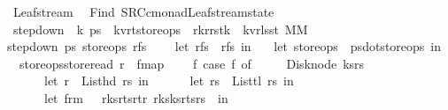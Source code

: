 %
\begin{isabellebody}%
%
%
\isadelimtheory
%
\endisadelimtheory
%
\isatagtheory
{}\isamarkupfalse%
\ Leaf{\isacharunderscore}stream\ \isanewline
{}\ Find\ {\isachardoublequoteopen}{\isachardollar}SRC{\isacharslash}c{\isacharunderscore}monad{\isacharslash}Leaf{\isacharunderscore}stream{\isacharunderscore}state{\isachardoublequoteclose}\isanewline
{}%
\endisatagtheory
{\isafoldtheory}%
%
\isadelimtheory
\isanewline
%
\endisadelimtheory
\isanewline
\isanewline
{}\isamarkupfalse%
\ step{\isacharunderscore}down\ {\isacharcolon}{\isacharcolon}\ {\isachardoublequoteopen}{\isacharprime}k\ ps{}\ {\isasymRightarrow}\ {\isacharparenleft}{\isacharprime}k{\isacharcomma}{\isacharprime}v{\isacharcomma}{\isacharprime}r{\isacharcomma}{\isacharprime}t{\isacharparenright}store{\isacharunderscore}ops\ {\isasymRightarrow}\ {\isacharprime}r{\isacharasterisk}{\isacharparenleft}{\isacharprime}k{\isacharcomma}{\isacharprime}r{\isacharparenright}rstk\ {\isasymRightarrow}\ {\isacharparenleft}{\isacharparenleft}{\isacharprime}k{\isacharcomma}{\isacharprime}v{\isacharcomma}{\isacharprime}r{\isacharparenright}lss{\isacharcomma}{\isacharprime}t{\isacharparenright}\ MM{\isachardoublequoteclose}\ \isanewline
{\isachardoublequoteopen}step{\isacharunderscore}down\ ps{}\ store{\isacharunderscore}ops\ rfs\ {\isacharequal}\ {\isacharparenleft}\isanewline
\ \ let\ {\isacharparenleft}r{\isacharcomma}fs{\isacharparenright}\ {\isacharequal}\ rfs\ in\isanewline
\ \ {\isacharparenleft}{\isacharasterisk}\ let\ store{\isacharunderscore}ops\ {\isacharequal}\ ps{}{\isacharbar}{\isachargreater}dot{\isacharunderscore}store{\isacharunderscore}ops\ in\ {\isacharasterisk}{\isacharparenright}\isanewline
\ \ {\isacharparenleft}store{\isacharunderscore}ops{\isacharbar}{\isachargreater}store{\isacharunderscore}read{\isacharparenright}\ r\ {\isacharbar}{\isachargreater}\ fmap\ \isanewline
\ \ {\isacharparenleft}{\isacharpercent}\ f{\isachardot}\ case\ f\ of\ \isanewline
\ \ \ \ Disk{\isacharunderscore}node\ {\isacharparenleft}ks{\isacharcomma}rs{\isacharparenright}\ {\isasymRightarrow}\ {\isacharparenleft}\isanewline
\ \ \ \ \ \ let\ r{\isacharprime}\ {\isacharequal}\ List{\isachardot}hd\ rs\ in\isanewline
\ \ \ \ \ \ let\ rs{\isacharprime}\ {\isacharequal}\ List{\isachardot}tl\ rs\ in\isanewline
\ \ \ \ \ \ let\ frm\ {\isacharequal}\ {\isasymlparr}\ r{\isacharunderscore}ks{}{\isacharequal}{\isacharbrackleft}{\isacharbrackright}{\isacharcomma}r{\isacharunderscore}ts{}{\isacharequal}{\isacharbrackleft}{\isacharbrackright}{\isacharcomma}r{\isacharunderscore}t{\isacharequal}r{\isacharprime}{\isacharcomma}\ r{\isacharunderscore}ks{}{\isacharequal}ks{\isacharcomma}r{\isacharunderscore}ts{}{\isacharequal}rs{\isacharprime}\ {\isasymrparr}\ in\isanewline

\end{isabellebody}
